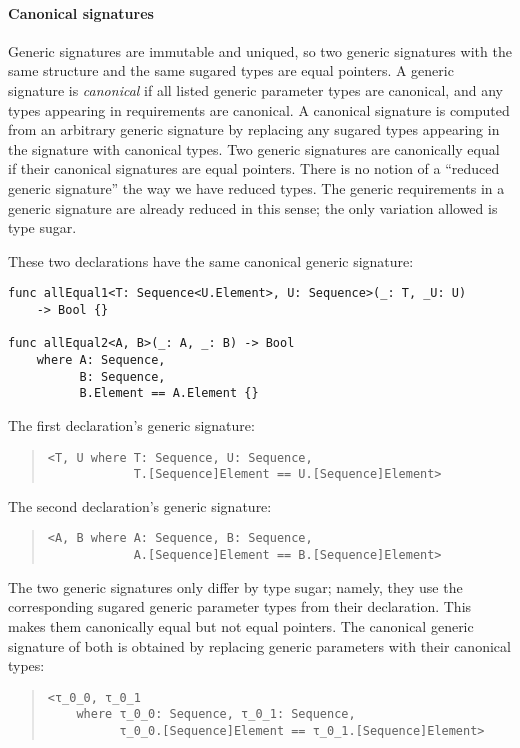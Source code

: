 \documentclass[../generics]{subfiles}
\begin{document}
\paragraph{Canonical signatures}
Generic signatures are immutable and uniqued, so two generic signatures with the same structure and the same sugared types are equal pointers. A generic signature is \emph{canonical} if all listed generic parameter types are canonical, and any types appearing in requirements are canonical. A canonical signature is computed from an arbitrary generic signature by replacing any sugared types appearing in the signature with canonical types. Two generic signatures are canonically equal if their canonical signatures are equal pointers. There is no notion of a ``reduced generic signature'' the way we have reduced types. The generic requirements in a generic signature are already reduced in this sense; the only variation allowed is type sugar.
\begin{example}
These two declarations have the same canonical generic signature:
\begin{Verbatim}
func allEqual1<T: Sequence<U.Element>, U: Sequence>(_: T, _U: U)
    -> Bool {}

func allEqual2<A, B>(_: A, _: B) -> Bool
    where A: Sequence,
          B: Sequence,
          B.Element == A.Element {}
\end{Verbatim}
The first declaration's generic signature:
\begin{quote}
\begin{verbatim}
<T, U where T: Sequence, U: Sequence,
            T.[Sequence]Element == U.[Sequence]Element>
\end{verbatim}
\end{quote}

The second declaration's generic signature:
\begin{quote}
\begin{verbatim}
<A, B where A: Sequence, B: Sequence,
            A.[Sequence]Element == B.[Sequence]Element>
\end{verbatim}
\end{quote}
The two generic signatures only differ by type sugar; namely, they use the corresponding sugared generic parameter types from their declaration. This makes them canonically equal but not equal pointers. The canonical generic signature of both is obtained by replacing generic parameters with their canonical types:
\begin{quote}
\begin{verbatim}
<τ_0_0, τ_0_1
    where τ_0_0: Sequence, τ_0_1: Sequence,
          τ_0_0.[Sequence]Element == τ_0_1.[Sequence]Element>
\end{verbatim}
\end{quote}
\end{example}
\end{document}

